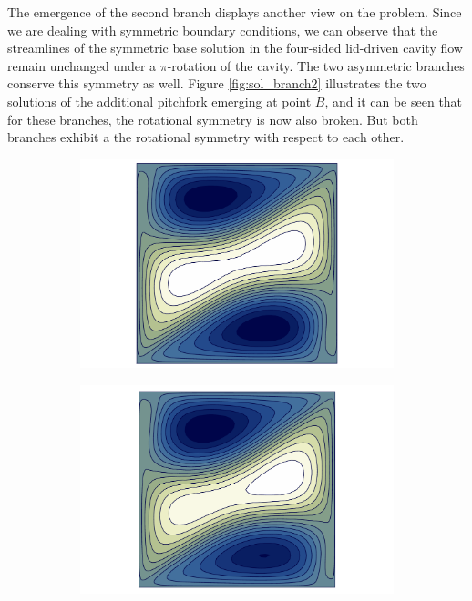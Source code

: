 The emergence of the second branch displays another view on the problem. Since
we are dealing with symmetric boundary conditions, we can observe that the
streamlines of the symmetric base solution in the four-sided lid-driven cavity
flow remain unchanged under a $\pi$-rotation of the cavity. The two asymmetric
branches conserve this symmetry as well. Figure \ref{fig:sol_branch2}
illustrates the two solutions of the additional pitchfork emerging at point
$B$, and it can be seen that for these branches, the rotational symmetry is now
also broken. But both branches exhibit a the rotational symmetry with respect
to each other.

\begin{figure}[h!]
\begin{subfigure}[b]{0.33\textwidth}
  \centering
  \includegraphics[trim={2cm 0 2cm 0},clip,width=\textwidth]{figs/psi_Re353.356_pf3.pdf}
\end{subfigure}
\begin{subfigure}[b]{0.33\textwidth}
  \centering
  \includegraphics[trim={2cm 0 2cm 0},clip,width=\textwidth]{figs/psi_Re375.000_branch2_u_t_smaller.pdf}

\end{subfigure}
\end{figure}

